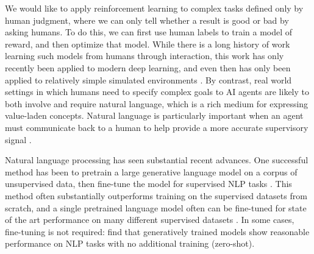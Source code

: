 \documentclass{article}
\begin{document}
We would like to apply reinforcement learning to complex tasks defined only by human judgment, where we can only tell whether a result is good or bad by asking humans.  To do this, we can first use human labels to train a model of reward, and then optimize that model.  While there is a long history of work learning such models from humans through interaction, this work has only recently been applied to modern deep learning, and even then has only been applied to relatively simple simulated environments \citep{christiano2017deep,ibarz2018,bahdanau2018learning}.  By contrast, real world settings in which humans need to specify complex goals to AI agents are likely to both involve and require natural language, which is a rich medium for expressing value-laden concepts.  Natural language is particularly important when an agent must communicate back to a human to help provide a more accurate supervisory signal \citep{irving2018debate,christiano2018amplification,leike2018scalable}.

Natural language processing has seen substantial recent advances.  One successful method has been to pretrain a large generative language model on a corpus of unsupervised data, then fine-tune the model for supervised NLP tasks \citep{dai2015semi, peters2018deep, radford2018improving, khandelwal2019sample}.  This method often substantially outperforms training on the supervised datasets from scratch, and a single pretrained language model often can be fine-tuned for state of the art performance on many different supervised datasets \citep{howard2018universal}.  In some cases, fine-tuning is not required: \citet{radford2019language} find that generatively trained models show reasonable performance on NLP tasks with no additional training (zero-shot).
\end{document}
